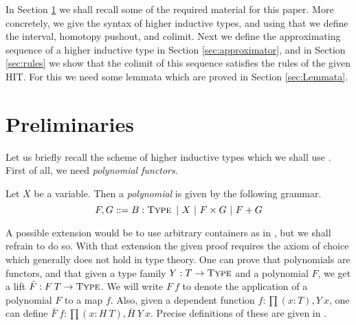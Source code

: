 \documentclass[a4paper,UKenglish]{lipics-v2016}
\newcommand{\Type}[0]{\operatorname{\textsc{Type}}}
\begin{document}
In Section \ref{sec:prelims} we shall recall some of the required material for this paper.
More concretely, we give the syntax of higher inductive types, and using that we define the interval, homotopy pushout, and colimit.
Next we define the approximating sequence of a higher inductive type in Section \ref{sec:approximator}, and in Section \ref{sec:rules} we show that the colimit of this sequence satisfies the rules of the given HIT.
For this we need some lemmata which are proved in Section \ref{sec:Lemmata}.

\section{Preliminaries}
\label{sec:prelims}
Let us briefly recall the scheme of higher inductive types which we shall use \cite{basoldhigher}.
First of all, we need \emph{polynomial functors}.
\begin{definition}
Let $X$ be a variable.
Then a \emph{polynomial} is given by the following grammar.
\[
F, G ::= B : \Type \ | \ X \ | \ F \times G \ | \ F + G
\]
\end{definition}
A possible extension would be to use arbitrary containers as in \cite{abbott2005containers}, but we shall refrain to do so.
With that extension the given proof requires the axiom of choice which generally does not hold in type theory.
One can prove that polynomials are functors, and that given a type family $Y : T \rightarrow \Type$ and a polynomial $F$, we get a lift $\bar{F} : F \> T \rightarrow \Type$.
We will write $F \> f$ to denote the application of a polynomial $F$ to a map $f$.
Also, given a dependent function $f : \prod (x : T), Y \> x$, one can define $\bar{F} \> f : \prod (x : H \> T), \bar{H} \> Y \> x$.
Precise definitions of these are given in \cite{basoldhigher}.
\end{document}
